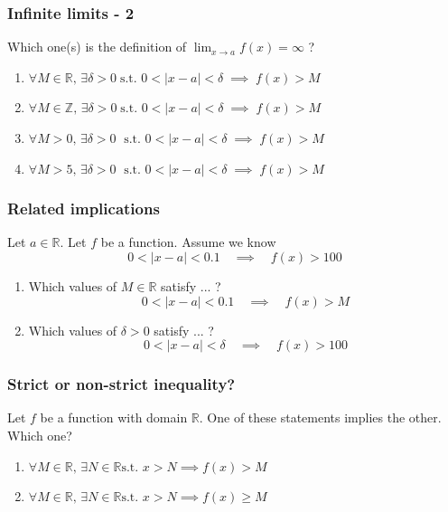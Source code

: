 \documentclass[14pt]{beamer}
\begin{document}
\begin{frame}[t]
	\frametitle{Infinite limits - 2}

	Which one(s) is the definition of $\displaystyle \lim_{x \to a}f(x) = \infty$ ?
	\vfill
	\begin{enumerate}
		\item $\displaystyle \forall M \in \mathbb{R}, \, \exists \delta > 0 \; \text{
			s.t. }0 < |x-a|<\delta \; \implies \; f(x) > M$
			\vfill

		\item $\displaystyle \forall M \in \mathbb{Z}, \, \exists \delta > 0 \; \text{
			s.t. }0 < |x-a|<\delta \; \implies \; f(x) > M$
			\vfill

		\item $\displaystyle \forall M > 0, \, \exists \delta > 0 \; \text{ s.t. }0 <
			|x-a|<\delta \; \implies \; f(x) > M$
			\vfill

		\item $\displaystyle \forall M > 5, \, \exists \delta > 0 \; \text{ s.t. }0 <
			|x-a|<\delta \; \implies \; f(x) > M$
			\vfill

	\end{enumerate}
\end{frame}

\begin{frame}[t]
	\frametitle{Related implications}

	Let $a \in \mathbb{R}$. Let $f$ be a function. Assume we know
	\[
		0 < |x-a| < 0.1 \quad \implies \quad f(x) > 100
	\]
	\vspace{-.5cm}
	\begin{enumerate}
		\item Which values of $M \in \mathbb{R}$ satisfy ... ?
			\[
				0 < |x-a| < 0.1 \quad \implies \quad f(x) > M
			\]
			\vspace{-.5cm}

		\item Which values of $\delta>0$ satisfy ... ?
			\[
				0 < |x-a| < \delta \quad \implies \quad f(x) > 100
			\]
	\end{enumerate}
\end{frame}

\begin{frame}
	\frametitle{Strict or non-strict inequality?}

	Let $f$ be a function with domain $\mathbb{R}$. One of these statements implies
	the other. Which one?

	\begin{enumerate}
		\item $\displaystyle \forall M \in \mathbb{R}, \, \exists N \in \mathbb{R}\text{
			s.t. }x>N \implies f(x) > M$

		\item $\displaystyle \forall M \in \mathbb{R}, \, \exists N \in \mathbb{R}\text{
			s.t. }x>N \implies f(x) \geq M$
	\end{enumerate}
\end{frame}
\end{document}
